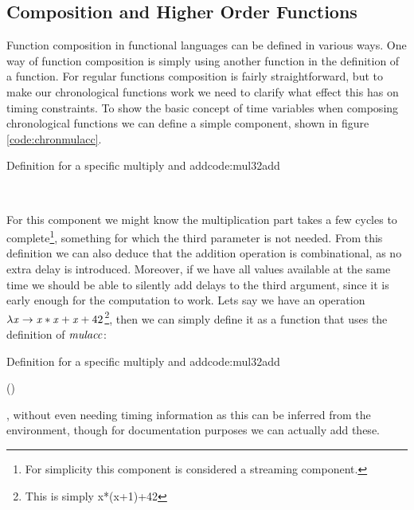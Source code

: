 \subsection{Composition and Higher Order Functions}
Function composition in functional languages can be defined in various ways.
One way of function composition is simply using another function in the definition of a function.
For regular functions composition is fairly straightforward, but to make our chronological functions work we need to clarify what effect this has on timing constraints.
To show the basic concept of time variables when composing chronological functions we can define a simple component, shown in figure \ref{code:chronmulacc}.
\begin{texexptitled}{Definition for a specific multiply and add}{code:mul32add}
\begin{hscode}\SaveRestoreHook
{}%
%
\>[B]{}\mathbin{::}\langle{}\rangle\to {}\langle{}\rangle\to {}\langle{}\mathbin{+}\rangle\to {}\langle{}\mathbin{+}\rangle{}\<[E]%
\\
\>[B]{}\;\;\;\mathrel{=}\mathbin{*}\mathbin{+}\<[E]%
\ColumnHook
\end{hscode}\resethooks
\end{texexptitled}
For this component we might know the multiplication part takes a few cycles to complete\footnote{For simplicity this component is considered a streaming component.}, something for which the third parameter is not needed.
From this definition we can also deduce that the addition operation is combinational, as no extra delay is introduced.
Moreover, if we have all values available at the same time we should be able to silently add delays to the third argument, since it is early enough for the computation to work.
Lets say we have an operation \ensuremath{\lambda \Varid{x}\to \Varid{x}\mathbin{*}\Varid{x}\mathbin{+}\Varid{x}\mathbin{+}\mathrm{42}}\footnote{This is simply x*(x+1)+42}, then we can simply define it as a function that uses the definition of \ensuremath{\Varid{mulacc}}:
\begin{texexptitled}{Definition for a specific multiply and add}{code:mul32add}
\begin{hscode}\SaveRestoreHook
{}%
%
\>[B]{}\;\mathrel{=}\mathbin{+}(\;\;\;){}\<[E]%
\ColumnHook
\end{hscode}\resethooks
\end{texexptitled}
, without even needing timing information as this can be inferred from the environment, though for documentation purposes we can actually add these.

